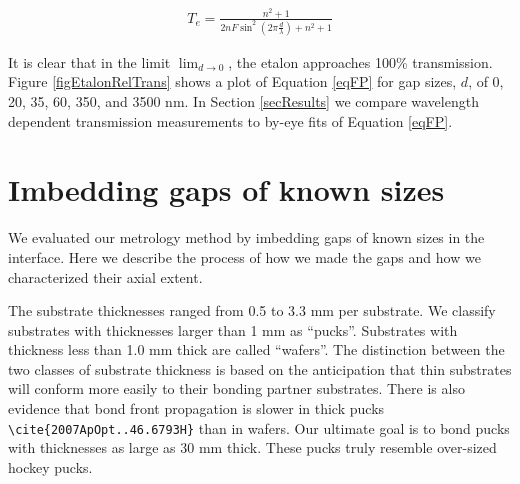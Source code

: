 \documentclass[osajnl,preprint,showpacs,superscriptaddress,12pt]{revtex4-1} %
\begin{document}
\begin{eqnarray}
T_{e} = \frac{n^2+1}{2 n F \sin ^2(2\pi \frac{d}{\lambda})+n^2+1} \label{eqFP}
\end{eqnarray}

It is clear that in the limit $\lim_{d \rightarrow 0}$, the etalon approaches 100\% transmission.  Figure \ref{figEtalonRelTrans} shows a plot of Equation \ref{eqFP} for gap sizes, $d$, of 0, 20, 35, 60, 350, and 3500 nm.  In Section \ref{secResults} we compare wavelength dependent transmission measurements to by-eye fits of Equation \ref{eqFP}.  

\section{Imbedding gaps of known sizes}

We evaluated our metrology method by imbedding gaps of known sizes in the interface.  Here we describe the process of how we made the gaps and how we characterized their axial extent.  

The substrate thicknesses ranged from 0.5 to 3.3 mm per substrate.  We classify substrates with thicknesses larger than 1 mm as ``pucks''.  Substrates with thickness less than 1.0 mm thick are called ``wafers''.  The distinction between the two classes of substrate thickness is based on the anticipation that thin substrates will conform more easily to their bonding partner substrates.  There is also evidence that bond front propagation is slower in thick pucks \verb|\cite{2007ApOpt..46.6793H}| than in wafers.  Our ultimate goal is to bond pucks with thicknesses as large as 30 mm thick.  These pucks truly resemble over-sized hockey pucks.  
\end{document}
